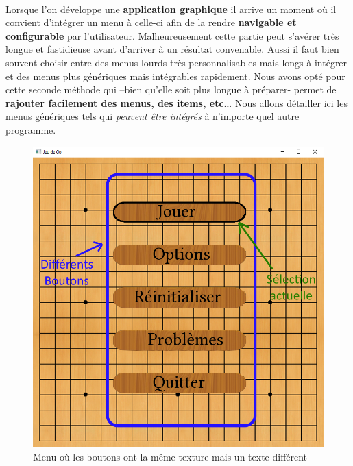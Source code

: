             \paragraph{}Lorsque l’on développe une \textbf{application graphique} il arrive un moment où il convient d’intégrer un menu à celle-ci afin de la rendre \textbf{navigable et configurable} par l’utilisateur. Malheureusement cette partie peut s’avérer très longue et fastidieuse avant d’arriver à un résultat convenable. Aussi il faut bien souvent choisir entre des menus lourds très personnalisables mais longs à intégrer et des menus plus génériques mais intégrables rapidement. Nous avons opté pour cette seconde méthode qui –bien qu’elle soit plus longue à préparer- permet de \textbf{rajouter facilement des menus, des items, etc…} Nous allons détailler ici les menus génériques tels qui \textit{peuvent être intégrés} à n’importe quel autre programme.
            
            \begin{figure}[h!]
            \centering
            \includegraphics[scale=0.45]{figures/experiments/Menu_main.png}
            \caption{Menu où les boutons ont la même texture mais un texte différent}
            \label{fig:butto_txt}
            \end{figure}
            
